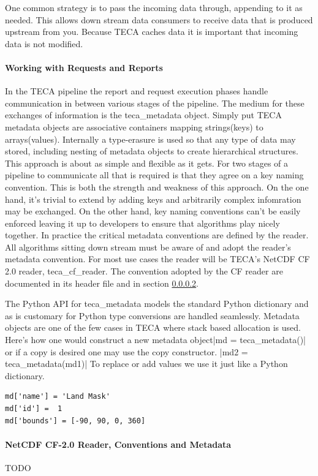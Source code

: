 \documentclass[a4paper,10pt,DIV=12]{scrreprt}
\begin{document}
\noindent One common strategy is to pass the incoming data through, appending to it as needed. This allows down stream data consumers to receive data that is produced upstream from you. Because TECA caches data it is important that incoming data is not modified.

\paragraph{Working with Requests and Reports} In the TECA pipeline the report and request execution phases handle communication in between various stages of the pipeline. The medium for these exchanges of information is the teca\_metadata object. Simply put TECA metadata objects are associative containers mapping strings(keys) to arrays(values). Internally a type-erasure is used so that any type of data may stored, including nesting of metadata objects to create hierarchical structures. This approach is about as simple and flexible as it gets. For two stages of a pipeline to communicate all that is required is that they agree on a key naming convention. This is both the strength and weakness of this approach. On the one hand, it's trivial to extend by adding keys and arbitrarily complex infomration may be exchanged. On the other hand, key naming conventions can't be easily enforced leaving it up to developers to ensure that algorithms play nicely together. In practice the critical metadata conventions are defined by the reader. All algorithms sitting down stream must be aware of and adopt the reader's metadata convention. For most use cases the reader will be TECA's NetCDF CF 2.0 reader, teca\_cf\_reader. The convention adopted by the CF reader are documented in its header file and in section \ref{sec:cf_reader}.

The Python API for teca\_metadata models the standard Python dictionary and as is customary for Python type conversions are handled seamlessly. Metadata objects are one of the few cases in TECA where stack based allocation is used. Here's how one would construct a new metadata object|md = teca_metadata()| or if a copy is desired one may use the copy constructor. |md2 = teca_metadata(md1)| To replace or add values we use it just like a Python dictionary.
\begin{verbatim}
md['name'] = 'Land Mask'
md['id'] =  1
md['bounds'] = [-90, 90, 0, 360]
\end{verbatim}



\paragraph{NetCDF CF-2.0 Reader, Conventions and Metadata} \label{sec:cf_reader}
TODO
\end{document}
